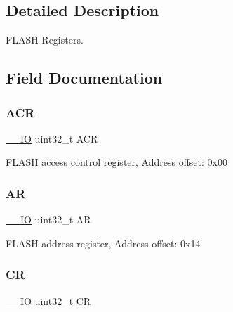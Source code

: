 \subsection{Detailed Description}
F\+L\+A\+SH Registers. 

\subsection{Field Documentation}
\mbox{\label{struct_f_l_a_s_h___type_def_a9cb55206b29a8c16354747c556ab8bea}} 
\subsubsection{\texorpdfstring{A\+CR}{ACR}}
{\footnotesize\ttfamily \hyperlink{core__sc300_8h_aec43007d9998a0a0e01faede4133d6be}{\+\_\+\+\_\+\+IO} uint32\+\_\+t A\+CR}

F\+L\+A\+SH access control register, Address offset\+: 0x00 \mbox{\label{struct_f_l_a_s_h___type_def_a2ac50357d1ebac2949d27bfc4855e6a4}} 
\subsubsection{\texorpdfstring{AR}{AR}}
{\footnotesize\ttfamily \hyperlink{core__sc300_8h_aec43007d9998a0a0e01faede4133d6be}{\+\_\+\+\_\+\+IO} uint32\+\_\+t AR}

F\+L\+A\+SH address register, Address offset\+: 0x14 \mbox{\label{struct_f_l_a_s_h___type_def_ab40c89c59391aaa9d9a8ec011dd0907a}} 
\subsubsection{\texorpdfstring{CR}{CR}}
{\footnotesize\ttfamily \hyperlink{core__sc300_8h_aec43007d9998a0a0e01faede4133d6be}{\+\_\+\+\_\+\+IO} uint32\+\_\+t CR}


